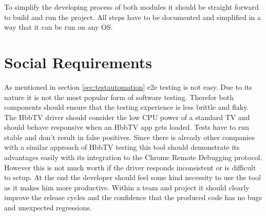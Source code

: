 To simplify the developing process of both modules it should be straight forward to build
and run the project. All steps have to be documented and simplified in a way that it can
be run on any OS.

\section{Social Requirements\label{sec:socreq}}

As mentioned in section \ref{sec:testautomation} e2e testing is not easy. Due to its nature it
is not the most popular form of software testing. Therefor both components should ensure that
the testing experience is less brittle and flaky. The HbbTV driver should consider the low
CPU power of a standard TV and should behave responsive when an HbbTV app gets loaded. Tests
have to run stable and don't result in false positives. Since there is already other companies
with a similar approach of HbbTV testing this tool should demonstrate its advantages easily
with its integration to the Chrome Remote Debugging protocol. However this is not much worth
if the driver responds inconsistent or is difficult to setup. At the end the developer should
feel some kind necessity to use the tool as it makes him more productive. Within a team and
project it should clearly improve the release cycles and the confidence that the produced code
has no bugs and unexpected regressions.
